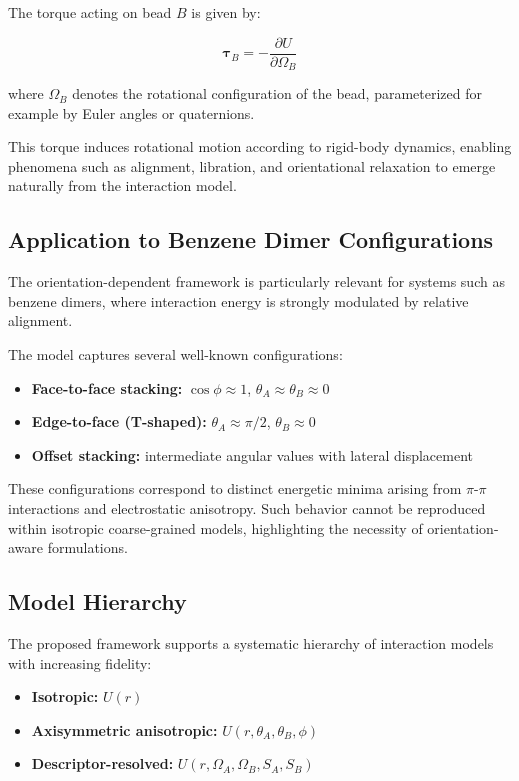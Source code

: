 \documentclass[11pt]{article}
\begin{document}
The torque acting on bead $B$ is given by:

\begin{equation}
\boldsymbol{\tau}_B = -\frac{\partial U}{\partial \Omega_B}
\end{equation}

where $\Omega_B$ denotes the rotational configuration of the bead, parameterized for example by Euler angles or quaternions.

This torque induces rotational motion according to rigid-body dynamics, enabling phenomena such as alignment, libration, and orientational relaxation to emerge naturally from the interaction model.

\subsection{Application to Benzene Dimer Configurations}

The orientation-dependent framework is particularly relevant for systems such as benzene dimers, where interaction energy is strongly modulated by relative alignment.

The model captures several well-known configurations:

\begin{itemize}
    \item \textbf{Face-to-face stacking:} $\cos\phi \approx 1$, $\theta_A \approx \theta_B \approx 0$
    \item \textbf{Edge-to-face (T-shaped):} $\theta_A \approx \pi/2$, $\theta_B \approx 0$
    \item \textbf{Offset stacking:} intermediate angular values with lateral displacement
\end{itemize}

These configurations correspond to distinct energetic minima arising from $\pi$-$\pi$ interactions and electrostatic anisotropy. Such behavior cannot be reproduced within isotropic coarse-grained models, highlighting the necessity of orientation-aware formulations.

\subsection{Model Hierarchy}

The proposed framework supports a systematic hierarchy of interaction models with increasing fidelity:

\begin{itemize}
    \item \textbf{Isotropic:} $U(r)$
    \item \textbf{Axisymmetric anisotropic:} $U(r,\theta_A,\theta_B,\phi)$
    \item \textbf{Descriptor-resolved:} $U(r,\Omega_A,\Omega_B,S_A,S_B)$
\end{itemize}
\end{document}
